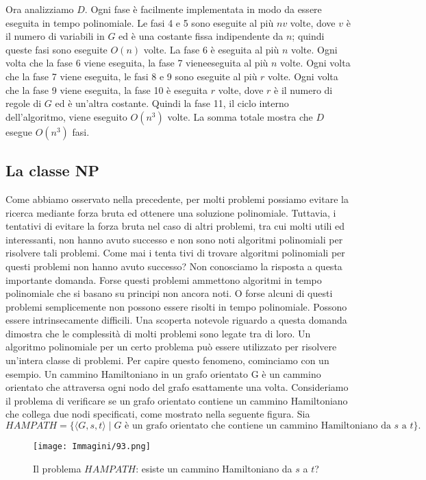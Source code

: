 \documentclass{article}
\begin{document}
Ora analizziamo $D$. 
Ogni fase è facilmente implementata in modo da essere eseguita in tempo polinomiale. 
Le fasi 4 e 5 sono eseguite al più $nv$ volte, dove $v$ è il numero di variabili in $G$ ed è una costante fissa indipendente da $n$;
quindi queste fasi sono eseguite $O(n)$ volte. 
La fase 6 è eseguita al più $n$ volte. 
Ogni volta che la fase 6 viene eseguita, la fase 7 vieneeseguita al più $n$ volte.
Ogni volta che la fase 7 viene eseguita, le fasi 8 e 9 sono eseguite al più $r$ volte. 
Ogni volta che la fase 9 viene eseguita, la fase 10 è eseguita $r$ volte, dove $r$ è il numero di regole di $G$ ed è un'altra costante.
Quindi la fase 11, il ciclo interno dell'algoritmo, viene eseguito $O(n^3)$ volte.
La somma totale mostra che $D$ esegue $O(n^3)$ fasi.
\newpage
\subsection{La classe NP}
Come abbiamo osservato nella precedente, per molti problemi possiamo evitare la ricerca mediante forza bruta ed ottenere una soluzione polinomiale.
Tuttavia, i tentativi di evitare la forza bruta nel caso di altri problemi, tra cui molti utili ed interessanti, non hanno avuto successo e non sono noti algoritmi polinomiali per risolvere tali problemi.
Come mai i tenta tivi di trovare algoritmi polinomiali per questi problemi non hanno avuto successo?
Non conosciamo la risposta a questa importante domanda.
Forse questi problemi ammettono algoritmi in tempo polinomiale che si basano su principi non ancora noti.
O forse alcuni di questi problemi semplicemente non possono essere risolti in tempo polinomiale.
Possono essere intrinsecamente difficili.
Una scoperta notevole riguardo a questa domanda dimostra che le complessità di molti problemi sono legate tra di loro.
Un algoritmo polinomiale per un certo problema può essere utilizzato per risolvere un'intera classe di problemi.
Per capire questo fenomeno, cominciamo con un esempio.
Un cammino Hamiltoniano in un grafo orientato G è un cammino orientato che attraversa ogni nodo del grafo esattamente una volta. 
Consideriamo il problema di verificare se un grafo orientato contiene un cammino Hamiltoniano che collega due nodi specificati, come mostrato nella seguente figura.
Sia
$$
HAMPATH = \{ \langle G, s, t \rangle \mid G \text{ è un grafo orientato che contiene un cammino Hamiltoniano da } s \text{ a } t \}.
$$
\begin{figure}[H]
    \centering
    \texttt{[image: Immagini/93.png]}
    \caption{Il problema $HAMPATH$: esiste un cammino Hamiltoniano da $s$ a $t$?}
    \label{fig:hampath}
\end{figure}
\end{document}
